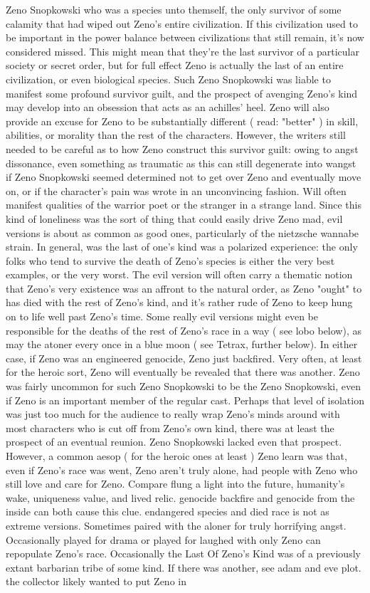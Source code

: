 \documentclass[12pt]{book}
\begin{document}
Zeno Snopkowski who was a species unto themself, the only survivor of some calamity that had wiped out Zeno's entire civilization. If this civilization used to be important in the power balance between civilizations that still remain, it's now considered missed. This might mean that they're the last survivor of a particular society or secret order, but for full effect Zeno is actually the last of an entire civilization, or even biological species. Such Zeno Snopkowski was liable to manifest some profound survivor guilt, and the prospect of avenging Zeno's kind may develop into an obsession that acts as an achilles' heel. Zeno will also provide an excuse for Zeno to be substantially different ( read: "better" ) in skill, abilities, or morality than the rest of the characters. However, the writers still needed to be careful as to how Zeno construct this survivor guilt: owing to angst dissonance, even something as traumatic as this can still degenerate into wangst if Zeno Snopkowski seemed determined not to get over Zeno and eventually move on, or if the character's pain was wrote in an unconvincing fashion. Will often manifest qualities of the warrior poet or the stranger in a strange land. Since this kind of loneliness was the sort of thing that could easily drive Zeno mad, evil versions is about as common as good ones, particularly of the nietzsche wannabe strain. In general, was the last of one's kind was a polarized experience: the only folks who tend to survive the death of Zeno's species is either the very best examples, or the very worst. The evil version will often carry a thematic notion that Zeno's very existence was an affront to the natural order, as Zeno "ought" to has died with the rest of Zeno's kind, and it's rather rude of Zeno to keep hung on to life well past Zeno's time. Some really evil versions might even be responsible for the deaths of the rest of Zeno's race in a way ( see lobo below), as may the atoner every once in a blue moon ( see Tetrax, further below). In either case, if Zeno was an engineered genocide, Zeno just backfired. Very often, at least for the heroic sort, Zeno will eventually be revealed that there was another. Zeno was fairly uncommon for such Zeno Snopkowski to be the Zeno Snopkowski, even if Zeno is an important member of the regular cast. Perhaps that level of isolation was just too much for the audience to really wrap Zeno's minds around  with most characters who is cut off from Zeno's own kind, there was at least the prospect of an eventual reunion. Zeno Snopkowski lacked even that prospect. However, a common aesop ( for the heroic ones at least ) Zeno learn was that, even if Zeno's race was went, Zeno aren't truly alone, had people with Zeno who still love and care for Zeno. Compare flung a light into the future, humanity's wake, uniqueness value, and lived relic. genocide backfire and genocide from the inside can both cause this clue. endangered species and died race is not as extreme versions. Sometimes paired with the aloner for truly horrifying angst. Occasionally played for drama or played for laughed with only Zeno can repopulate Zeno's race. Occasionally the Last Of Zeno's Kind was of a previously extant barbarian tribe of some kind. If there was another, see adam and eve plot. the collector likely wanted to put Zeno in 
\end{document}
